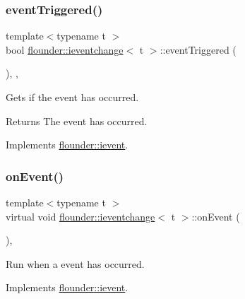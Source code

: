 \subsubsection{\texorpdfstring{event\+Triggered()}{eventTriggered()}}
{\footnotesize\ttfamily template$<$typename t $>$ \\
bool \hyperlink{classflounder_1_1ieventchange}{flounder\+::ieventchange}$<$ t $>$\+::event\+Triggered (\begin{DoxyParamCaption}{ }\end{DoxyParamCaption})\hspace{0.3cm}{\ttfamily [inline]}, {\ttfamily [override]}, {\ttfamily [virtual]}}



Gets if the event has occurred. 

\begin{DoxyReturn}{Returns}
The event has occurred. 
\end{DoxyReturn}


Implements \hyperlink{classflounder_1_1ievent_a4462f66feef99ef4e3521c00f4edd0c9}{flounder\+::ievent}.

\mbox{\label{classflounder_1_1ieventchange_ab4977a4a6c22b93e82ea294d0d906a9e}} 
\subsubsection{\texorpdfstring{on\+Event()}{onEvent()}}
{\footnotesize\ttfamily template$<$typename t $>$ \\
virtual void \hyperlink{classflounder_1_1ieventchange}{flounder\+::ieventchange}$<$ t $>$\+::on\+Event (\begin{DoxyParamCaption}{ }\end{DoxyParamCaption})\hspace{0.3cm}{\ttfamily [override]}, {}}



Run when a event has occurred. 



Implements \hyperlink{classflounder_1_1ievent_a6c6abe67435870b25eccd57a251a8992}{flounder\+::ievent}.

\mbox{\label{classflounder_1_1ieventchange_a6c7872d176004b7dfb4a01e90221976d}} 
